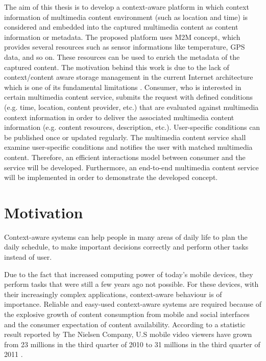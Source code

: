 The aim of this thesis is to develop a context-aware platform in which context information of multimedia content environment (such as location and time) is considered and embedded into the captured multimedia content as content information or metadata. The proposed platform uses \ac{M2M} concept, which provides several resources such as sensor informations like temperature, \ac{GPS} data, and so on. These resources can be used to enrich the metadata of the captured content. The motivation behind this work is due to the lack of context/content aware storage management in the current Internet architecture which is one of its fundamental limitations \cite{ec1}. Consumer, who is interested in certain multimedia content service, submits the request with defined conditions (e.g. time, location, content provider, etc.) that are evaluated against multimedia context information in order to deliver the associated multimedia content information (e.g. content resources, description, etc.). User-specific conditions can be published once or updated regularly. The multimedia content service shall examine user-specific conditions and notifies the user with matched multimedia content. Therefore, an efficient interactions model between consumer and the service will be developed. Furthermore, an end-to-end multimedia content service will be implemented in order to demonstrate the developed concept.

\section{Motivation\label{sec:moti}}

Context-aware systems can help people in many areas of daily life to plan the daily schedule, to make important decisions correctly and perform other tasks instead of user.

Due to the fact that increased computing power of today's mobile devices, they perform tasks that were still a few years ago not possible. For these devices, with their increasingly complex applications, context-aware behaviour is of importance. Reliable and easy-used context-aware systems are required because of the explosive growth of content consumption from mobile and social interfaces and the consumer expectation of content availability. According to a statistic result reported by The Nielsen Company, U.S mobile video viewers have grown from 23 millions in the third quarter of 2010 to 31 millions in the third quarter of 2011 \cite{mobile-media-report}.

